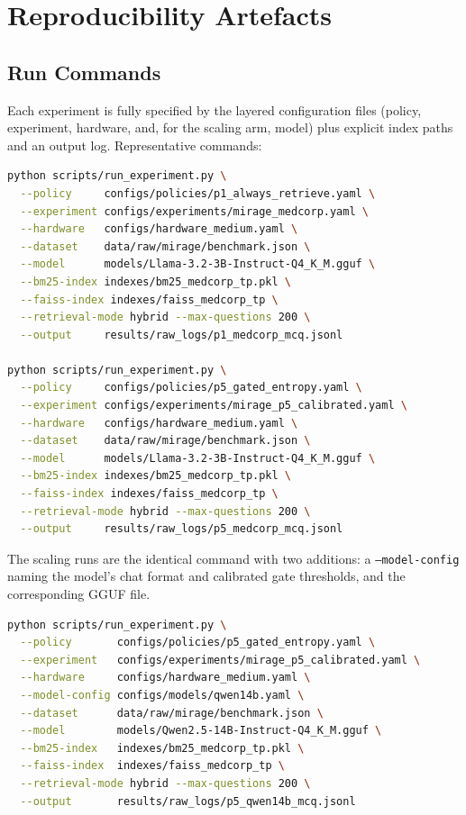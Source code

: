 \chapter{Reproducibility Artefacts}
\label{app:repro}

\section{Run Commands}
\label{app:commands}

Each experiment is fully specified by the layered configuration files
(policy, experiment, hardware, and, for the scaling arm, model) plus
explicit index paths and an output log. Representative commands:

\begin{lstlisting}[language=bash,caption={Main MCQ runs on the real corpus (3B, CPU).}]
python scripts/run_experiment.py \
  --policy     configs/policies/p1_always_retrieve.yaml \
  --experiment configs/experiments/mirage_medcorp.yaml \
  --hardware   configs/hardware_medium.yaml \
  --dataset    data/raw/mirage/benchmark.json \
  --model      models/Llama-3.2-3B-Instruct-Q4_K_M.gguf \
  --bm25-index indexes/bm25_medcorp_tp.pkl \
  --faiss-index indexes/faiss_medcorp_tp \
  --retrieval-mode hybrid --max-questions 200 \
  --output     results/raw_logs/p1_medcorp_mcq.jsonl

python scripts/run_experiment.py \
  --policy     configs/policies/p5_gated_entropy.yaml \
  --experiment configs/experiments/mirage_p5_calibrated.yaml \
  --hardware   configs/hardware_medium.yaml \
  --dataset    data/raw/mirage/benchmark.json \
  --model      models/Llama-3.2-3B-Instruct-Q4_K_M.gguf \
  --bm25-index indexes/bm25_medcorp_tp.pkl \
  --faiss-index indexes/faiss_medcorp_tp \
  --retrieval-mode hybrid --max-questions 200 \
  --output     results/raw_logs/p5_medcorp_mcq.jsonl
\end{lstlisting}

The scaling runs are the identical command with two additions: a
\texttt{--model-config} naming the model's chat format and calibrated gate
thresholds, and the corresponding GGUF file.

\begin{lstlisting}[language=bash,caption={Scaling arm (Qwen2.5-14B); only the model and its config change.}]
python scripts/run_experiment.py \
  --policy       configs/policies/p5_gated_entropy.yaml \
  --experiment   configs/experiments/mirage_p5_calibrated.yaml \
  --hardware     configs/hardware_medium.yaml \
  --model-config configs/models/qwen14b.yaml \
  --dataset      data/raw/mirage/benchmark.json \
  --model        models/Qwen2.5-14B-Instruct-Q4_K_M.gguf \
  --bm25-index   indexes/bm25_medcorp_tp.pkl \
  --faiss-index  indexes/faiss_medcorp_tp \
  --retrieval-mode hybrid --max-questions 200 \
  --output       results/raw_logs/p5_qwen14b_mcq.jsonl
\end{lstlisting}

